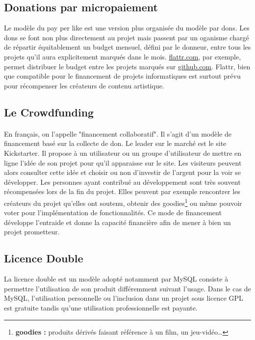    \subsection{Donations par micropaiement}

Le modèle du pay per like est une version plus organisée du modèle par dons.
Les dons se font non plus directement au projet mais passent par un oganisme
chargé de répartir équitablement un budget mensuel, défini par le donneur,
entre tous les projets qu'il aura explicitement marqués dans le mois.
\url{flattr.com}, par exemple, permet distribuer le budget entre les projets
marqués sur \url{github.com}. Flattr, bien que compatible pour le financement
de projets informatiques est surtout prévu pour récompenser les créateurs de
contenu artistique.

    \subsection{Le Crowdfunding}

\paragraph{} En français, on l'appelle "financement collaboratif". Il s'agit
d'un modèle de financement basé sur la collecte de don. Le leader sur le marché
est le site Kickstarter. Il propose à un utilisateur ou un groupe d'utilisateur
de mettre en ligne l'idée de son projet pour qu'il apparaisse sur le site. Les
visiteurs peuvent alors consulter cette idée et choisir ou non d'investir de
l'argent pour la voir se développer. Les personnes ayant contribué au
développement sont très souvent récompensées lors de la fin du projet.
Elles peuvent
par exemple rencontrer les créateurs du projet qu'elles ont soutenu, obtenir des
goodies\footnote{\textbf{goodies :} produits dérivés faisant référence à un
film, un jeu-vidéo\ldots} ou même pouvoir voter pour l'implémentation de
fonctionnalités.  Ce mode de financement développe l'entraide et donne la
capacité financière afin de mener à bien un projet prometteur.

    \subsection{Licence Double}

La licence double est un modèle adopté notamment par MySQL consiste à permettre
l'utilisation de son produit différemment suivant l'usage. Dans le cas de
MySQL, l'utilisation personnelle ou l'inclusion dans un projet sous licence GPL
est gratuite tandis qu'une utilisation professionnelle est payante.

